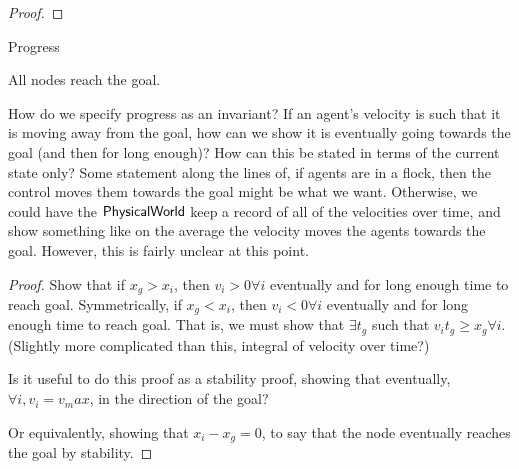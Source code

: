\documentclass[10pt, conference, compsocconf]{IEEEtran}
\begin{document}
\begin{proof}
%
%
%
%
%
%
%
\end{proof}

\begin{inv}Progress

All nodes reach the goal.
\end{inv}

How do we specify progress as an invariant?  If an agent's velocity is such that it is moving away from the goal, how can we show it is eventually going towards the goal (and then for long enough)?  How can this be stated in terms of the current state only?  Some statement along the lines of, if agents are in a flock, then the control moves them towards the goal might be what we want.  Otherwise, we could have the ${\operatorname{\mathsf{PhysicalWorld}}}$ keep a record of all of the velocities over time, and show something like on the average the velocity moves the agents towards the goal.  However, this is fairly unclear at this point.

\begin{proof}
Show that if $x_g > x_i$, then $v_i > 0 \forall i$ eventually and for long enough time to reach goal.  Symmetrically, if $x_g < x_i$, then $v_i < 0 \forall i$ eventually and for long enough time to reach goal.  That is, we must show that $\exists t_g$ such that $v_i t_g \geq x_g \forall i$.  (Slightly more complicated than this, integral of velocity over time?)

Is it useful to do this proof as a stability proof, showing that eventually, $\forall i, v_i = v_max$, in the direction of the goal?

Or equivalently, showing that $x_i - x_g = 0$, to say that the node eventually reaches the goal by stability.
\end{proof}
\end{document}

